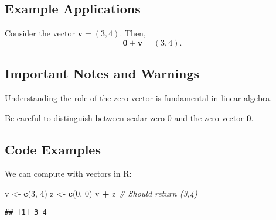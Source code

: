 \documentclass[
  14pt,
  a4paper,
]{extarticle}
\newenvironment{Shaded}{\begin{snugshade}}{\end{snugshade}}
\newcommand{\CommentTok}[1]{\textcolor[rgb]{0.56,0.35,0.01}{\textit{#1}}}
\newcommand{\DecValTok}[1]{\textcolor[rgb]{0.00,0.00,0.81}{#1}}
\newcommand{\FunctionTok}[1]{\textcolor[rgb]{0.13,0.29,0.53}{\textbf{#1}}}
\newcommand{\NormalTok}[1]{#1}
\newcommand{\OtherTok}[1]{\textcolor[rgb]{0.56,0.35,0.01}{#1}}
\newcommand{\SpecialCharTok}[1]{\textcolor[rgb]{0.81,0.36,0.00}{\textbf{#1}}}
\begin{document}
\subsection{Example Applications}\label{example-applications}

\begin{example}\label{ex:vector-example}

Consider the vector \(\mathbf{v} = (3,4)\). Then, \[
\mathbf{0} + \mathbf{v} = (3,4).
\]

\end{example}

\subsection{Important Notes and
Warnings}\label{important-notes-and-warnings}

\begin{importantbox}

Understanding the role of the zero vector is fundamental in linear
algebra.

\end{importantbox}

\begin{warningbox}

Be careful to distinguish between scalar zero \(0\) and the zero vector
\(\mathbf{0}\).

\end{warningbox}

\subsection{Code Examples}\label{code-examples}

We can compute with vectors in R:

\begin{Shaded}
\begin{Highlighting}[]
\NormalTok{v }\OtherTok{\textless{}{-}} \FunctionTok{c}\NormalTok{(}\DecValTok{3}\NormalTok{, }\DecValTok{4}\NormalTok{)}
\NormalTok{z }\OtherTok{\textless{}{-}} \FunctionTok{c}\NormalTok{(}\DecValTok{0}\NormalTok{, }\DecValTok{0}\NormalTok{)}
\NormalTok{v }\SpecialCharTok{+}\NormalTok{ z  }\CommentTok{\# Should return (3,4)}
\end{Highlighting}
\end{Shaded}

\begin{verbatim}
## [1] 3 4
\end{verbatim}
\end{document}
